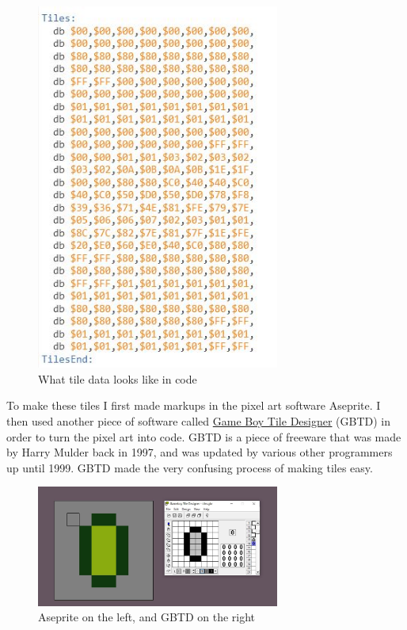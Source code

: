 \documentclass{article}
\begin{document}
\begin{figure}[htp]
    \centering
    \includegraphics[width=8cm]{images/TilesCode.JPG}
    \caption{What tile data looks like in code}
    \label{Tiles Code}
\end{figure}

To make these tiles I first made markups in the pixel art software Aseprite. I then used another piece of software called \href{http://www.devrs.com/gb/hmgd/gbtd.html}{Game Boy Tile Designer} (GBTD) in order to turn the pixel art into code. GBTD is a piece of freeware that was made by Harry Mulder back in 1997, and was updated by various other programmers up until 1999. GBTD made the very confusing process of making tiles easy.

\begin{figure}[htp]
    \centering
    \includegraphics[width=8cm]{images/makingBullet.JPG}
    \caption{Aseprite on the left, and GBTD on the right}
    \label{Making the bullet sprite}
\end{figure}
\end{document}
